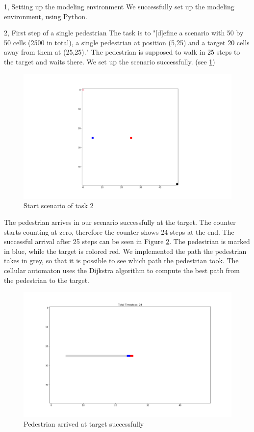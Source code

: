 \documentclass[10pt,a4paper]{article}
\begin{document}
\frontpage

\begin{task}{1, Setting up the modeling environment}
We successfully set up the modeling environment, using Python.
\end{task}

\begin{task}{2, First step of a single pedestrian}
The task is to "[d]efine a scenario with 50 by 50 cells (2500 in total), a single pedestrian at position (5,25) and a target 20 cells away from them at (25,25)." The pedestrian is supposed to walk in 25 steps to the target and waits there. We set up the scenario successfully. (see \ref{fig:start_2})
\begin{figure}[h!]
    \centering
    \includegraphics[width=\textwidth]{pictures/2_Start.png}
    \caption{Start scenario of task 2}
    \label{fig:start_2}
\end{figure}
\newpage
The pedestrian arrives in our scenario successfully at the target. The counter starts counting at zero, therefore the counter shows 24 steps at the end. The successful arrival after 25 steps can be seen in Figure \ref{fig:end_2}. The pedestrian is marked in blue, while the target is colored red. We implemented the path the pedestrian takes in grey, so that it is possible to see which path the pedestrian took. The cellular automaton uses the Dijkstra algorithm to compute the best path from the pedestrian to the target.
\begin{figure}
    \centering
    \includegraphics[width=\textwidth]{pictures/End.png}
    \caption{Pedestrian arrived at target successfully}
    \label{fig:end_2}
\end{figure}
\end{task}
\end{document}
